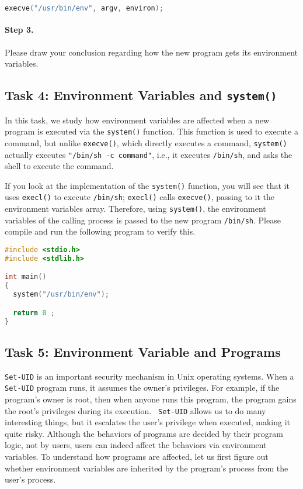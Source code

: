 \begin{lstlisting}[language=C]
execve("/usr/bin/env", argv, environ);
\end{lstlisting}


\paragraph{Step 3.} Please draw your conclusion regarding how the new
program gets its environment variables.



\subsection{Task 4: Environment Variables and {\tt system()}}

In this task, we study how environment variables are affected
when a new program is executed via the {\tt system()} function. This
function is used to execute a command, but unlike
{\tt execve()}, which directly executes a command, {\tt system()}
actually executes {\tt "/bin/sh -c command"}, i.e., it
executes {\tt /bin/sh}, and asks the shell to execute the command.

If you look at the implementation of the {\tt system()} function, you will
see that it uses {\tt execl()} to execute {\tt /bin/sh}; {\tt execl()}
calls {\tt execve()}, passing to it the environment variables array.
Therefore, using {\tt system()},  the environment variables of the calling process
is passed to the new program {\tt /bin/sh}. Please compile and run the following program
to verify this.


\begin{lstlisting}[language=C]
#include <stdio.h>
#include <stdlib.h>

int main()
{
  system("/usr/bin/env");

  return 0 ;
}
\end{lstlisting}



\subsection{Task 5: Environment Variable and \setuid Programs}

{\tt Set-UID} is an important security mechanism in Unix operating systems.
When a {\tt Set-UID} program runs, it assumes the owner's privileges. For
example, if the program's owner is root, then when anyone runs this
program, the program gains the root's privileges during its execution. {\tt
Set-UID} allows us to do many interesting things, but it escalates the
user's privilege when executed, making it quite risky. Although the
behaviors of \setuid programs are decided by their program logic, not by
users, users can indeed affect the behaviors via environment variables.
To understand how \setuid programs are affected, let us first figure out
whether environment variables are inherited by the \setuid program's
process from the user's process.


